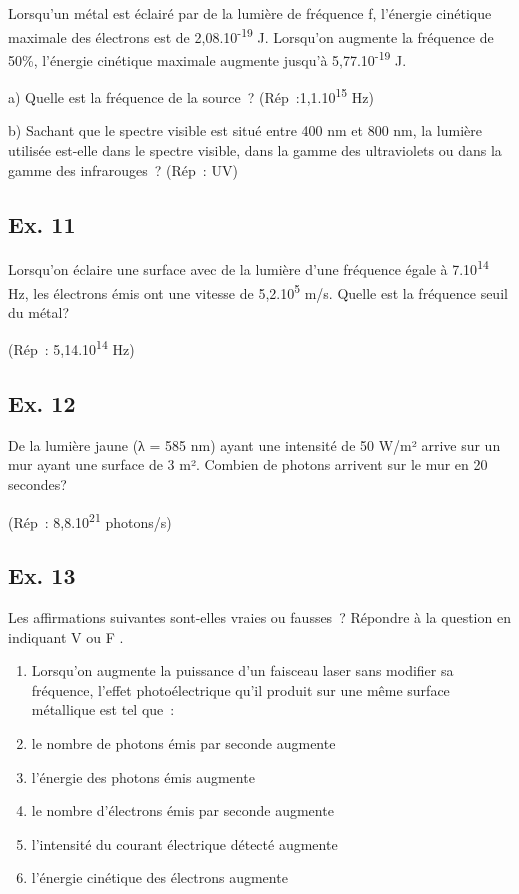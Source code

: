 {Lorsqu'un métal est éclairé par de la lumière de fréquence f, l'énergie
cinétique maximale des électrons est de 2,08.10\textsuperscript{-19} J.
Lorsqu'on augmente la fréquence de 50\%, l'énergie cinétique maximale
augmente jusqu'à 5,77.10\textsuperscript{-19} J.

a) Quelle est la fréquence de la source~?
(Rép~:1,1.10\textsuperscript{15} Hz)

b) Sachant que le spectre visible est situé entre 400 nm et 800 nm, la
lumière utilisée est-elle dans le spectre visible, dans la gamme des
ultraviolets ou dans la gamme des infrarouges~? (Rép~: UV)

\subsection{Ex. 11}

Lorsqu'on éclaire une surface avec de la lumière d'une fréquence égale à
7.10\textsuperscript{14 }Hz, les électrons émis ont une vitesse de
5,2.10\textsuperscript{5} m/s. Quelle est la fréquence seuil du métal?

(Rép~: 5,14.10\textsuperscript{14} Hz)

\subsection{Ex. 12}

De la lumière jaune (λ = 585 nm) ayant une intensité de 50 W/m² arrive
sur un mur ayant une surface de 3 m². Combien de photons arrivent sur le
mur en 20 secondes?

(Rép~: 8,8.10\textsuperscript{21} photons/s)

\subsection{Ex. 13}

Les affirmations suivantes sont-elles vraies ou fausses~? Répondre à la
question en indiquant V ou F .

\begin{enumerate}
\item  Lorsqu'on augmente la puissance d'un faisceau laser sans modifier sa
  fréquence, l'effet photoélectrique qu'il produit sur une même surface
  métallique est tel que~:
\item le nombre de photons émis par seconde augmente
\item  l'énergie des photons émis augmente
\item  le nombre d'électrons émis par seconde augmente
\item  l'intensité du courant électrique détecté augmente
\item  l'énergie cinétique des électrons augmente
\end{enumerate}

}
